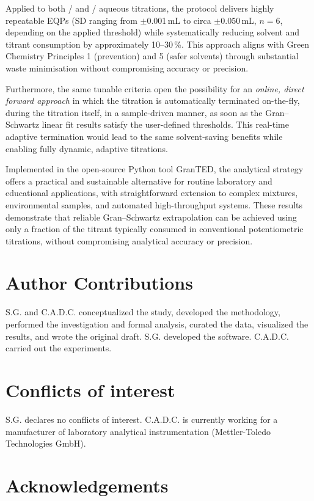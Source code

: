 \documentclass[twoside,twocolumn,9pt]{article}
\begin{document}
{Applied to both / and / aqueous titrations, the protocol delivers highly repeatable EQPs (SD ranging from $\pm$0.001\,mL to circa $\pm$0.050\,mL, $n=6$, depending on the applied threshold) while systematically reducing solvent and titrant consumption by approximately 10--30\,\%. This approach aligns with Green Chemistry Principles 1 (prevention) and 5 (safer solvents) through substantial waste minimisation without compromising accuracy or precision.

Furthermore, the same tunable criteria open the possibility for an \emph{online, direct forward approach} in which the titration is automatically terminated on-the-fly, during the titration itself, in a sample-driven manner, as soon as the Gran--Schwartz linear fit results satisfy the user-defined thresholds. This real-time adaptive termination would lead to the same solvent-saving benefits while enabling fully dynamic, adaptive titrations.

Implemented in the open-source Python tool \textsf{GranTED}, the analytical strategy offers a practical and sustainable alternative for routine laboratory and educational applications, with straightforward extension to complex mixtures, environmental samples, and automated high-throughput systems. These results demonstrate that reliable Gran--Schwartz extrapolation can be achieved using only a fraction of the titrant typically consumed in conventional potentiometric titrations, without compromising analytical accuracy or precision.

\section*{Author Contributions}

S.G. and C.A.D.C. conceptualized the study, developed the methodology, performed the investigation and formal analysis, curated the data, visualized the results, and wrote the original draft. S.G. developed the software. C.A.D.C. carried out the experiments.

\section*{Conflicts of interest}

S.G. declares no conflicts of interest. C.A.D.C. is currently working for a manufacturer of laboratory analytical instrumentation (Mettler-Toledo Technologies GmbH).

\section*{Acknowledgements}

}
\end{document}
